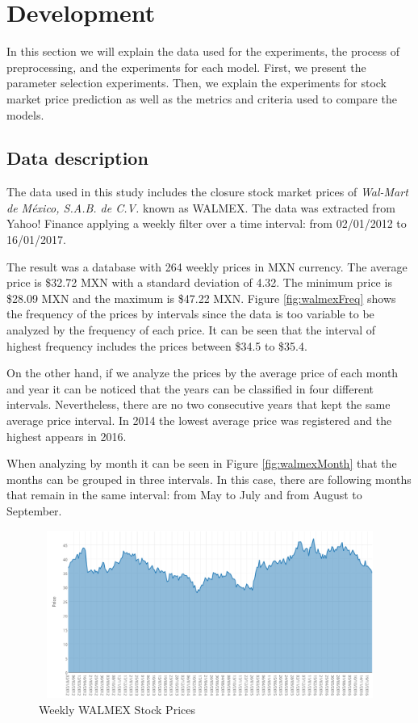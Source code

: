 \chapter{Development}
\label{ch:dev}

In this section we will explain the data used for the experiments, the process of preprocessing, and the experiments for each model. First, we present the parameter selection experiments. Then, we explain the experiments for stock market price prediction as well as the metrics and criteria used to compare the models.

\section{Data description}
The data used in this study includes the closure stock market prices of \textit{Wal-Mart de México, S.A.B. de C.V.} known as WALMEX. The data was extracted from Yahoo! Finance applying a weekly filter over a time interval: from 02/01/2012 to 16/01/2017.

The result was a database with 264 weekly prices in MXN currency. The average price is \$32.72 MXN with a standard deviation of 4.32. The minimum price is \$28.09 MXN and the maximum is \$47.22 MXN. Figure \ref{fig:walmexFreq} shows the frequency of the prices by intervals since the data is too variable to be analyzed by the frequency of each price. It can be seen that the interval of highest frequency includes the prices between \$34.5 to \$35.4. 

On the other hand, if we analyze the prices by the average price of each month and year it can be noticed that the years can be classified in four different intervals. Nevertheless, there are no two consecutive years that kept the same average price interval. In 2014 the lowest average price was registered and the highest appears in 2016.

When analyzing by month it can be seen in Figure \ref{fig:walmexMonth} that the months can be grouped in three intervals. In this case, there are following months that remain in the same interval: from May to July and from August to September. 

 
\begin{figure}
\center
\includegraphics[width=12.5cm,height=5.5cm]{Figures/wamexCompleto.PNG}
\caption{Weekly WALMEX Stock Prices}
\label{fig:walmexComp}
\end{figure}

